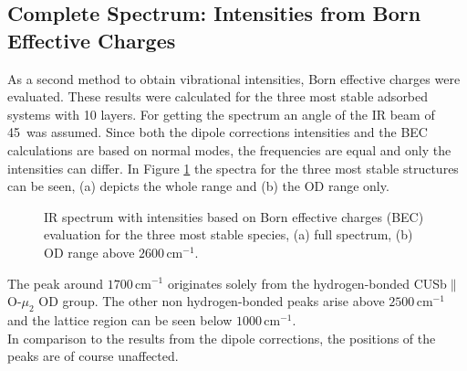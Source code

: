 \documentclass[11pt,DIV=13,BCOR=5mm,a4paper,headinclude]{scrbook}
\begin{document}
\subsection{Complete Spectrum: Intensities from Born Effective Charges}\label{bec}
As a second method to obtain vibrational intensities, Born effective charges were evaluated.
These results were calculated for the three most stable adsorbed systems with 10 layers.
For getting the spectrum an angle of the IR beam of 45\textdegree~was assumed.
Since both the dipole corrections intensities and the BEC calculations are based on normal modes, the frequencies are equal and only the intensities can differ.
In Figure \ref{abb:bec} the spectra for the three most stable structures can be seen, (a) depicts the whole range and (b) the OD range only.
\begin{figure}[!h]
    \centering
             \quad
             \caption{IR spectrum with intensities based on Born effective charges (BEC) evaluation for the three most stable species, (a) full spectrum, (b) OD range above $2600\,$cm$^{-1}$.}
            \label{abb:bec}
     \end{figure}
The peak around $1700\,$cm$^{-1}$ originates solely from the hydrogen-bonded CUSb$\parallel$O-$\mu_2$ OD group.
The other non hydrogen-bonded peaks arise above $2500\,$cm$^{-1}$ and the lattice region can be seen below $1000\,$cm$^{-1}$.
\\
In comparison to the results from the dipole corrections, the positions of the peaks are of course unaffected.
\end{document}
